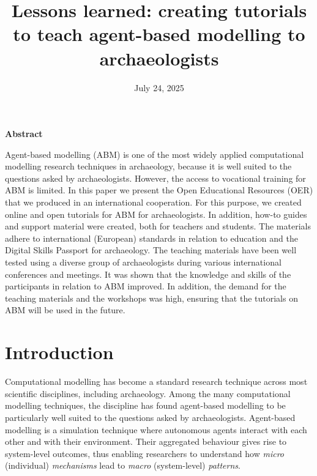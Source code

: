 \documentclass[
]{article}
\title{Lessons learned: creating tutorials to teach agent-based modelling to archaeologists}
\author{}
\date{\vspace{-2.5em}July 24, 2025}
\begin{document}
\maketitle

{
\setcounter{tocdepth}{2}
\tableofcontents
}
\textbf{Abstract}

Agent-based modelling (ABM) is one of the most widely applied computational modelling research techniques in archaeology, because it is well suited to the questions asked by archaeologists. However, the access to vocational training for ABM is limited. In this paper we present the Open Educational Resources (OER) that we produced in an international cooperation. For this purpose, we created online and open tutorials for ABM for archaeologists. In addition, how-to guides and support material were created, both for teachers and students. The materials adhere to international (European) standards in relation to education and the Digital Skills Passport for archaeology. The teaching materials have been well tested using a diverse group of archaeologists during various international conferences and meetings. It was shown that the knowledge and skills of the participants in relation to ABM improved. In addition, the demand for the teaching materials and the workshops was high, ensuring that the tutorials on ABM will be used in the future.

\hypertarget{introduction}{%
\section{Introduction}\label{introduction}}

Computational modelling has become a standard research technique across most scientific disciplines, including archaeology. Among the many computational modelling techniques, the discipline has found agent-based modelling to be particularly well suited to the questions asked by archaeologists. Agent-based modelling is a simulation technique where autonomous agents interact with each other and with their environment. Their aggregated behaviour gives rise to system-level outcomes, thus enabling researchers to understand how \emph{micro} (individual) \emph{mechanisms} lead to \emph{macro} (system-level) \emph{patterns}.
\end{document}
